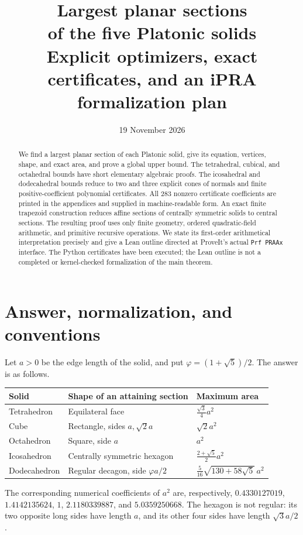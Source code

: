 \documentclass[11pt,letterpaper]{article}
\title{\textbf{Largest planar sections\\of the five Platonic solids}\\[5pt]
 \large Explicit optimizers, exact certificates, and an iPRA formalization plan}
\author{}
\date{19 November 2026}
\theoremstyle{definition}\newtheorem{definition}[theorem]{Definition}
\begin{document}
\maketitle
\begin{abstract}
We find a largest planar section of each Platonic solid, give its equation,
vertices, shape, and exact area, and prove a global upper bound. The
tetrahedral, cubical, and octahedral bounds have short elementary algebraic
proofs. The icosahedral and dodecahedral bounds reduce to two and three
explicit cones of normals and finite positive-coefficient polynomial
certificates. All 283 nonzero certificate coefficients are printed in the
appendices and supplied in machine-readable form. An exact finite
trapezoid construction reduces affine sections of centrally symmetric
solids to central sections. The resulting proof uses only finite geometry,
ordered quadratic-field arithmetic, and primitive recursive operations.
We state its first-order arithmetical interpretation precisely and give a
Lean outline directed at ProveIt's actual \texttt{Prf PRAAx} interface.
The Python certificates have been executed; the Lean outline is not a
completed or kernel-checked formalization of the main theorem.
\end{abstract}

\section{Answer, normalization, and conventions}
Let $a>0$ be the edge length of the solid, and put
$\varphi=(1+\sqrt5)/2$. The answer is as follows.
\begin{center}
\renewcommand{\arraystretch}{1.4}
\begin{tabular}{@{}lll@{}}
\toprule
Solid & Shape of an attaining section & Maximum area\\
\midrule
Tetrahedron & Equilateral face & $\displaystyle\frac{\sqrt3}{4}a^2$\\
Cube & Rectangle, sides $a,\sqrt2a$ & $\sqrt2a^2$\\
Octahedron & Square, side $a$ & $a^2$\\
Icosahedron & Centrally symmetric hexagon & $\displaystyle\frac{2+\sqrt5}{2}a^2$\\
Dodecahedron & Regular decagon, side $\varphi a/2$ &
 $\displaystyle\frac5{16}\sqrt{130+58\sqrt5}\,a^2$\\
\bottomrule
\end{tabular}
\end{center}
The corresponding numerical coefficients of $a^2$ are, respectively,
$0.4330127019$, $1.4142135624$, $1$, $2.1180339887$, and
$5.0359250668$. The hexagon is not regular: its two opposite long sides
have length $a$, and its other four sides have length $\sqrt3a/2$.
\end{document}
